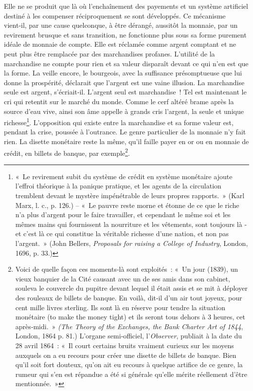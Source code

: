 \documentclass[french,twoside]{book} %
\begin{document}
Elle ne se produit que là où l’enchaînement des payements et un système artificiel destiné à les compenser réciproquement se sont développés. Ce mécanisme vient‑il, par une cause quelconque, à être dérangé, aussitôt la monnaie, par un revirement brusque et sans transition, ne fonctionne plus sous sa forme purement idéale de monnaie de compte. Elle est réclamée comme argent comptant et ne peut plus être remplacée par des marchandises profanes. L’utilité de la marchandise ne compte pour rien et sa valeur disparaît devant ce qui n’en est que la forme. La veille encore, le bourgeois, avec la suffisance présomptueuse que lui donne la prospérité, déclarait que l’argent est une vaine illusion. La marchandise seule est argent, s’écriait‑il. L’argent seul est marchandise ! Tel est maintenant le cri qui retentit sur le marché du monde. Comme le cerf altéré brame après la source d’eau vive, ainsi son âme appelle à grands cris l’argent, la seule et unique richesse\footnote{« Le revirement subit du système de crédit en système monétaire ajoute l’effroi théorique à la panique pratique, et les agents de la circulation tremblent devant le mystère impénétrable de leurs propres rapports. » (Karl Marx, l. c., p. 126.) – « Le pauvre reste morne et étonne de ce que le riche n’a plus d’argent pour le faire travailler, et cependant le même soi et les mêmes mains qui fournissent la nourriture et les vêtements, sont toujours là ‑ et c’est là ce qui constitue la véritable richesse d’une nation, et non pas l’argent. » (John Bellers, \emph{Proposals for raising a College of Industry}, London, 1696, p. 33.)}. L’opposition qui existe entre la marchandise et sa forme valeur est, pendant la crise, poussée à l’outrance. Le genre particulier de la monnaie n’y fait rien. La disette monétaire reste la même, qu’il faille payer en or ou en monnaie de crédit, en billets de banque, par exemple\footnote{Voici de quelle façon ces moments‑là sont exploités : « Un jour (1839), un vieux banquier de la Cité causant avec un de ses amis dans son cabinet, souleva le couvercle du pupitre devant lequel il était assis et se mit à déployer des rouleaux de billets de banque. En voilà, dit‑il d’un air tout joyeux, pour cent mille livres sterling. Ils sont là en réserve pour tendre la situation monétaire (to make the money tight) et ils seront tous dehors à 3 heures, cet après‑midi. » \emph{(The Theory of the Exchanges, the Bank Charter Art of 1844}, London, 1864 p. 81.) L’organe semi‑officiel, l’\emph{Observer}, publiait à la date du 28 avril 1864 : « Il court certains bruits vraiment curieux sur les moyens auxquels on a eu recours pour créer une disette de billets de banque. Bien qu’il soit fort douteux, qu’on ait eu recours à quelque artifice de ce genre, la rumeur qui s’en est répandue a été si générale qu’elle mérite réellement d’être mentionnée. »}.\par
\end{document}
